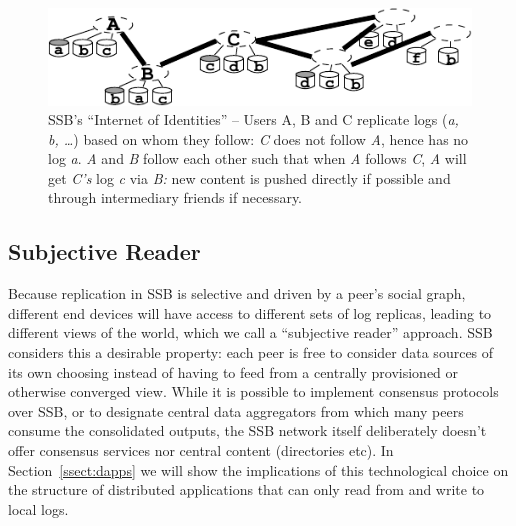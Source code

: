\documentclass[9pt,sigconf]{acmart}
\begin{document}
\begin{figure}[htb]
  \includegraphics[width=0.9\columnwidth]{figs/net-of-people.pdf}
  \caption{SSB's ``Internet of Identities'' -- {\rm\small Users A, B and C
      replicate logs ({\em a, b, \ldots}) based on whom they follow: {\em C} does not follow {\em A}, hence has no log {\em a}. {\em A} and {\em B} follow each other such that when {\em A} follows {\em C}, {\em A} will get {\em C's} log {\em c} via {\em B:} new content is pushed directly if possible and through intermediary friends if necessary.
    }\label{fig:net-of-people}}
\end{figure}


\subsection*{Subjective Reader}

Because replication in SSB is selective and driven by a peer's
social graph, different end devices will have access to different sets
of log replicas, leading to different views of the world, which we call
a ``subjective reader'' approach. SSB considers this a desirable
property: each peer is free to
consider data sources of its own choosing instead of having to feed
from a centrally provisioned or otherwise converged view. While it is
possible to implement consensus protocols over SSB, or to designate
central data aggregators from which many peers consume the
consolidated outputs, the SSB network itself deliberately doesn't
offer consensus services nor central content (directories etc). In
Section~\ref{ssect:dapps} we will show the implications of this
technological choice on the structure of distributed applications that
can only read from and write to local logs.
\end{document}
